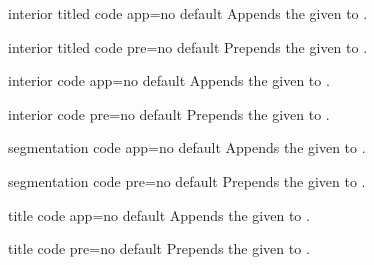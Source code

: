 \begin{docTcbKey}{interior titled code app}{=}{no default}
  Appends the given  to .
\begin{dispExample}
\begin{tcolorbox}[title=My title,enhanced,colframe=Navy,
  frame code app={\draw[yellow,line width=1cm] (
    frame.south west)--(frame.north east);},
  interior titled code app={\draw[red,line width=1cm]
    (frame.north west)--(frame.south east);},
  ]
\lipsum[1]
\end{tcolorbox}
\end{dispExample}
\end{docTcbKey}

\begin{docTcbKey}{interior titled code pre}{=}{no default}
  Prepends the given  to .
\end{docTcbKey}

\begin{docTcbKey}{interior code app}{=}{no default}
  Appends the given  to .
\end{docTcbKey}

\begin{docTcbKey}{interior code pre}{=}{no default}
  Prepends the given  to .
\end{docTcbKey}

\begin{docTcbKey}{segmentation code app}{=}{no default}
  Appends the given  to .
\end{docTcbKey}

\begin{docTcbKey}{segmentation code pre}{=}{no default}
  Prepends the given  to .
\end{docTcbKey}


\begin{docTcbKey}{title code app}{=}{no default}
  Appends the given  to .
\end{docTcbKey}

\begin{docTcbKey}{title code pre}{=}{no default}
  Prepends the given  to .
\end{docTcbKey}



